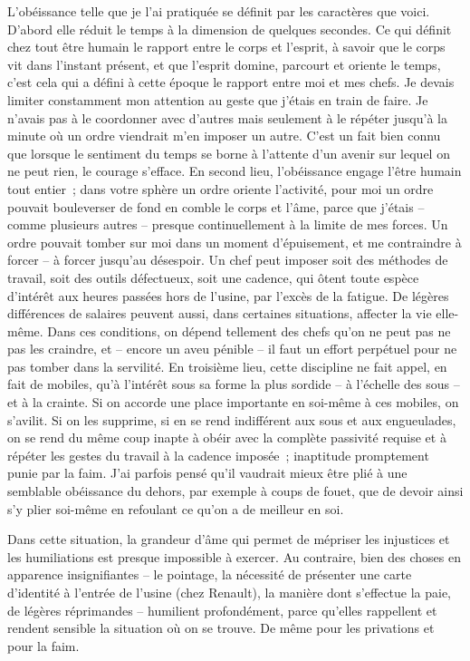 \documentclass[french,twoside]{book} %
\begin{document}
L'obéissance telle que je l'ai pratiquée se définit par les caractères que voici. D'abord elle réduit le temps à la dimension de quelques secondes. Ce qui définit chez tout être humain le rapport entre le corps et l'esprit, à savoir que le corps vit dans l'instant présent, et que l'esprit domine, parcourt et oriente le temps, c'est cela qui a défini à cette époque le rapport entre moi et mes chefs. Je devais limiter constamment mon attention au geste que j'étais en train de faire. Je n'avais pas à le coordonner avec d'autres mais seulement à le répéter jusqu'à la minute où un ordre viendrait m'en imposer un autre. C'est un fait bien connu que lorsque le sentiment du temps se borne à l'attente d'un avenir sur lequel on ne peut rien, le courage s'efface. En second lieu, l'obéissance engage l'être humain tout entier ; dans votre sphère un ordre oriente l'activité, pour moi un ordre pouvait bouleverser de fond en comble le corps et l'âme, parce que j'étais – comme plusieurs autres – presque continuellement à la limite de mes forces. Un ordre pouvait tomber sur moi dans un moment d'épuisement, et me contraindre à forcer – à forcer jusqu'au désespoir. Un chef peut imposer soit des méthodes de travail, soit des outils défectueux, soit une cadence, qui ôtent toute espèce d'intérêt aux heures passées hors de l'usine, par l'excès de la fatigue. De légères différences de salaires peuvent aussi, dans certaines situations, affecter la vie elle-même. Dans ces conditions, on dépend tellement des chefs qu'on ne peut pas ne pas les craindre, et – encore un aveu pénible – il faut un effort perpétuel pour ne pas tomber dans la servilité. En troisième lieu, cette discipline ne fait appel, en fait de mobiles, qu'à l'intérêt sous sa forme la plus sordide – à l'échelle des sous – et à la crainte. Si on accorde une place importante en soi-même à ces mobiles, on s'avilit. Si on les supprime, si en se rend indifférent aux sous et aux engueulades, on se rend du même coup inapte à obéir avec la complète passivité requise et à répéter les gestes du travail à la cadence imposée ; inaptitude promptement punie par la faim. J'ai parfois pensé qu'il vaudrait mieux être plié à une semblable obéissance du dehors, par exemple à coups de fouet, que de devoir ainsi s'y plier soi-même en refoulant ce qu'on a de meilleur en soi.\par
Dans cette situation, la grandeur d'âme qui permet de mépriser les injustices et les humiliations est presque impossible à exercer. Au contraire, bien des choses en apparence insignifiantes – le pointage, la nécessité de présenter une carte d'identité à l'entrée de l'usine (chez Renault), la manière dont s'effectue la paie, de légères réprimandes – humilient profondément, parce qu'elles rappellent et rendent sensible la situation où on se trouve. De même pour les privations et pour la faim.\par
\end{document}
